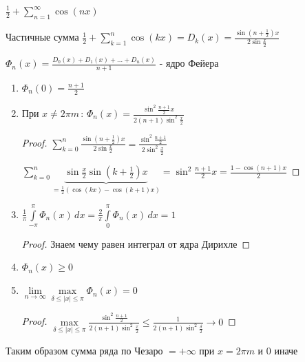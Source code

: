 \begin{example}
    $\frac{1}{2} + \sum\limits_{n=1}^\infty \cos (nx)$

    Частичные сумма $\frac{1}{2} + \sum\limits_{k=1}^n \cos (kx) = D_k (x) = \frac{\sin (n + \frac{1}{2})x}{2\sin \frac{x}{2}}$

    $\Phi_n (x) = \frac{D_0 (x) + D_1 (x) + \ldots + D_n (x)}{n + 1}$ - ядро Фейера

    \begin{properties}
        \begin{enumerate}
            \item {
                $\Phi_n (0) = \frac{n + 1}{2}$
            }
            \item {
                При $x \neq 2\pi m \, : \, \Phi_n (x) = \frac{\sin^2 \frac{n + 1}{2} x}{2(n + 1)\sin^2 \frac{x}{2}}$

                \begin{proof}
                    $\sum\limits_{k=0}^n \frac{\sin (n + \frac{1}{2})x}{2\sin \frac{x}{2}} = \frac{\sin^2 \frac{n+1}{2}}{2\sin^2 \frac{x}{2}}$

                    $\sum\limits_{k=0}^n \underbrace{\sin \frac{x}{2} \sin (k + \frac{1}{2})x}_{=\frac{1}{2} (\cos (kx) - \cos (k + 1)x)} = \sin^2 \frac{n+1}{2}x = \frac{1 - \cos (n + 1)x}{2}$
                \end{proof}
            }
            \item {
                $\frac{1}{\pi} \int\limits_{-\pi}^\pi \Phi_n (x) \, dx = \frac{2}{\pi} \int\limits_0^\pi \Phi_n (x) \, dx = 1$

                \begin{proof}
                    Знаем чему равен интеграл от ядра Дирихле
                \end{proof}
            }
            \item {
                $\Phi_n (x) \geqslant 0$
            }
            \item {
                $\lim\limits_{n \to \infty} \max\limits_{\delta \leqslant |x| \leqslant \pi} \Phi_n (x) = 0$

                \begin{proof}
                    $\max\limits_{\delta \leqslant |x| \leqslant \pi} \frac{\sin^2 \frac{n + 1}{2}}{2 (n+1) \sin^2 \frac{x}{2}} \leqslant \frac{1}{2(n+1)\sin^2 \frac{\delta}{2}} \rightarrow 0$
                \end{proof}
            }
        \end{enumerate}
    \end{properties}

    Таким образом сумма ряда по Чезаро $= +\infty$ при $x = 2\pi m$ и $0$ иначе
\end{example}

